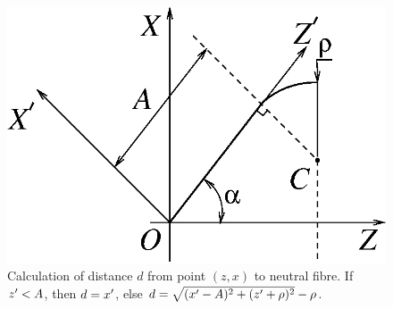 \begin{figure}
\centering
\includegraphics{qwave_prime.eps}
\caption{Calculation of distance $d$ from point $(z, x)$ to neutral fibre. 
If $z^{\prime}< A\/$, then  $d=x^{\prime}\/$, else $d =
\sqrt{(x^{\prime}-A)^2 + (z^{\prime}+\rho)^2} - \rho\/$.}
\label{qwave_prime}
\end{figure}
